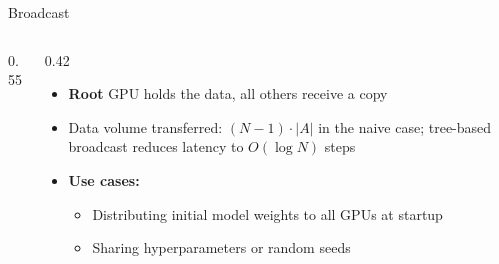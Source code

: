\begin{frame}{Broadcast}
\begin{columns}
\begin{column}{0.55\textwidth}
\begin{center}
      \end{center}
    \end{column}
    \begin{column}{0.42\textwidth}
      \begin{itemize}
        \item \textbf{Root} GPU holds the data, all others receive a copy
        \item Data volume transferred: $(N{-}1) \cdot |A|$ in the naive case; tree-based broadcast reduces latency to $O(\log N)$ steps
        \item \textbf{Use cases:}
          \begin{itemize}
            \item Distributing initial model weights to all GPUs at startup
            \item Sharing hyperparameters or random seeds
          \end{itemize}
      \end{itemize}
    \end{column}
  \end{columns}
\end{frame}

